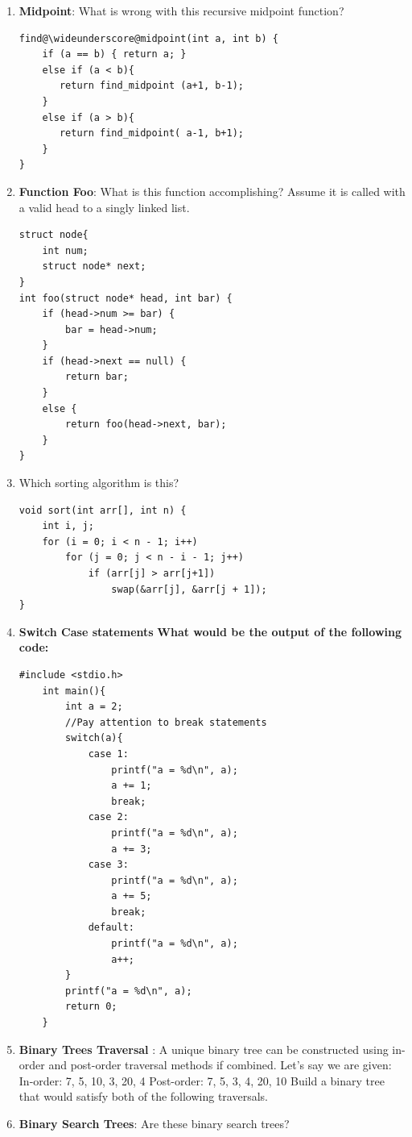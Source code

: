 \documentclass{article}
\begin{document}
\begin{enumerate}[label=(\alph*), itemsep = 120pt]
    \item \textbf{Midpoint}: What is wrong with this recursive midpoint function?
\begin{lstlisting}[style=CStyle] 
find@\wideunderscore@midpoint(int a, int b) {
    if (a == b) { return a; }
    else if (a < b){
       return find_midpoint (a+1, b-1);
    } 
    else if (a > b){
       return find_midpoint( a-1, b+1); 
    } 
}\end{lstlisting}  
    \newpage
    \item \textbf{Function Foo}: What is this function accomplishing? Assume it is called with a valid head to a singly linked list.
\begin{lstlisting}[style=CStyle] 
struct node{
    int num;
    struct node* next;
}
int foo(struct node* head, int bar) {
    if (head->num >= bar) {
        bar = head->num;
    }
    if (head->next == null) {
        return bar;
    }
    else {
        return foo(head->next, bar);
    }
}\end{lstlisting}  
    \item Which sorting algorithm is this?
\begin{lstlisting}[style=CStyle]
void sort(int arr[], int n) {
    int i, j;
    for (i = 0; i < n - 1; i++)
        for (j = 0; j < n - i - 1; j++)
            if (arr[j] > arr[j+1])
                swap(&arr[j], &arr[j + 1]);
}\end{lstlisting}

    \newpage

    \item \textbf{Switch Case statements}
    \newline \textbf{What would be the output of the following code:}
    \begin{lstlisting}[style = CStyle]
    #include <stdio.h>
    int main(){
        int a = 2;
        //Pay attention to break statements
        switch(a){
            case 1:
                printf("a = %d\n", a);
                a += 1;
                break;
            case 2:
                printf("a = %d\n", a);
                a += 3;
            case 3:
                printf("a = %d\n", a);
                a += 5;
                break;
            default:
                printf("a = %d\n", a);
                a++;
        }
        printf("a = %d\n", a);
        return 0;
    }
    \end{lstlisting}
    \item \textbf{Binary Trees Traversal} : 
    \newline A unique binary tree can be constructed using in-order and post-order traversal methods if combined.
    \newline Let’s say we are given:
    \newline In-order: 7, 5, 10, 3, 20, 4
    \newline Post-order: 7, 5, 3, 4, 20, 10
    \newline Build a binary tree that would satisfy both of the following traversals.
    \item \textbf{Binary Search Trees}: Are these binary search trees?
    

\end{enumerate}
\end{document}
